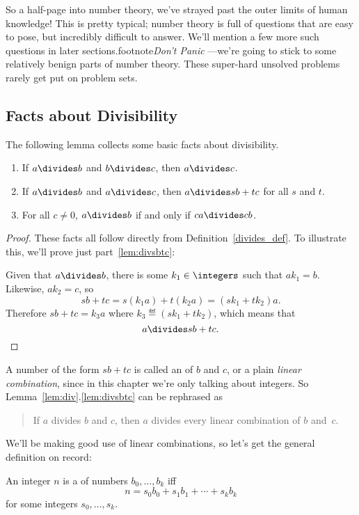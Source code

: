 So a half-page into number theory, we've strayed past the outer limits of human knowledge!
This is pretty typical; number theory is full of questions that are easy to pose, but
incredibly difficult to answer.  We'll mention a few more such questions in later
sections.footnote{\emph{Don't Panic} ---we're going to stick to some relatively benign
  parts of number theory.  These super-hard unsolved problems rarely get put on problem
  sets.}

\subsection{Facts about Divisibility}

The following lemma collects some basic facts about divisibility.

\begin{lemma}\label{lem:div}\mbox{}
\begin{enumerate}

\item\label{lem:divtrans} If $a \divides b$ and $b \divides c$, then $a \divides c$.

\item\label{lem:divsbtc} If $a \divides b$ and $a \divides c$, then $a \divides sb + tc$
  for all $s$ and $t$.

\item\label{lem:divcancel} For all $c \neq 0$, $a \divides b$ if and only if $ca \divides
  cb$.
\end{enumerate}
\end{lemma}

\begin{proof}
These facts all follow directly from Definition~\ref{divides_def}.  To illustrate this, we'll prove just
part~\ref{lem:divsbtc}:

Given that $a \divides b$, there is some $k_1 \in \integers$ such that $a k_1 = b$.
Likewise, $a k_2 = c$, so
\[
sb+tc= s(k_1a) + t(k_2a) = (sk_1+tk_2)a.
\]
Therefore $sb+tc = k_3a$ where $k_3 \eqdef (sk_1+tk_2)$, which means that
\[
a \divides sb+tc.
\]
\end{proof}

A number of the form $sb+tc$ is called an  of $b$ and $c$,
or a plain \emph{linear combination}, since in this chapter we're only talking about
integers.  So Lemma~\ref{lem:div}.\ref{lem:divsbtc} can be rephrased as
\begin{quote}
If $a$ divides $b$ and $c$, then $a$ divides every linear combination of $b$ and~$c$.
\end{quote}
We'll be making good use of linear combinations, so let's get the general definition on
record:
\begin{definition}\label{linear_def}
An integer $n$ is a  of numbers $b_0,\dots,b_k$ iff
\[
n = s_0b_0+s_1b_1+\cdots+s_kb_k
\]
for some integers $s_0,\dots,s_k$.
\end{definition}


